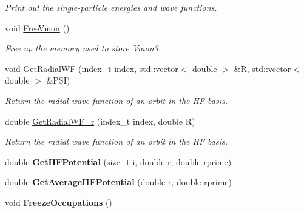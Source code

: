\begin{DoxyCompactItemize}
\begin{DoxyCompactList}\small\item\em Print out the single-\/particle energies and wave functions. \end{DoxyCompactList}\item 
\hypertarget{classHartreeFock_aef3c1b45c5418ead19f258774a301f83}{void \hyperlink{classHartreeFock_aef3c1b45c5418ead19f258774a301f83}{Free\-Vmon} ()}\label{classHartreeFock_aef3c1b45c5418ead19f258774a301f83}

\begin{DoxyCompactList}\small\item\em Free up the memory used to store Vmon3. \end{DoxyCompactList}\item 
\hypertarget{classHartreeFock_a948748d946c4186bce3252a6be2076df}{void \hyperlink{classHartreeFock_a948748d946c4186bce3252a6be2076df}{Get\-Radial\-W\-F} (index\-\_\-t index, std\-::vector$<$ double $>$ \&R, std\-::vector$<$ double $>$ \&P\-S\-I)}\label{classHartreeFock_a948748d946c4186bce3252a6be2076df}

\begin{DoxyCompactList}\small\item\em Return the radial wave function of an orbit in the H\-F basis. \end{DoxyCompactList}\item 
\hypertarget{classHartreeFock_a29de897a332985f5b08bd0f08a466db3}{double \hyperlink{classHartreeFock_a29de897a332985f5b08bd0f08a466db3}{Get\-Radial\-W\-F\-\_\-r} (index\-\_\-t index, double R)}\label{classHartreeFock_a29de897a332985f5b08bd0f08a466db3}

\begin{DoxyCompactList}\small\item\em Return the radial wave function of an orbit in the H\-F basis. \end{DoxyCompactList}\item 
\hypertarget{classHartreeFock_a212670984cab16c79f1c4cfd376f8e3d}{double {\bfseries Get\-H\-F\-Potential} (size\-\_\-t i, double r, double rprime)}\label{classHartreeFock_a212670984cab16c79f1c4cfd376f8e3d}

\item 
\hypertarget{classHartreeFock_aab893ac9710d1b5ce8797d55d99fd5f9}{double {\bfseries Get\-Average\-H\-F\-Potential} (double r, double rprime)}\label{classHartreeFock_aab893ac9710d1b5ce8797d55d99fd5f9}

\item 
\hypertarget{classHartreeFock_a3fb9fc68d98aedc4cf1aae52da237339}{void {\bfseries Freeze\-Occupations} ()}\label{classHartreeFock_a3fb9fc68d98aedc4cf1aae52da237339}


\end{DoxyCompactItemize}
